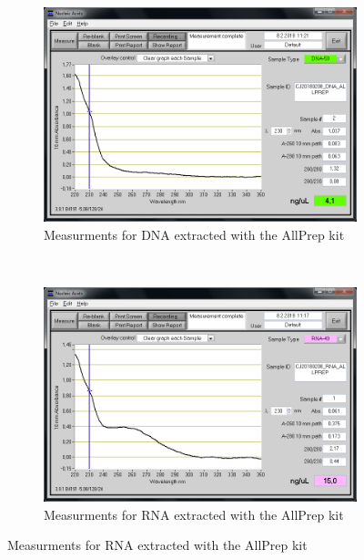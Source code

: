 \begin{figure}[H] %
    \centering
    \caption{Screen captures of the measurements by NanoDrop spectrophotometer}
    \label{fig:CJ20180208_ALLPREP}
    \begin{subfigure}[b]{0.49\textwidth}
        \includegraphics[width=\textwidth]{graphics/screenshots/CJ20180208_DNA_ALLPREP.png}
        \caption{Measurments for DNA extracted with the AllPrep kit}
        \label{sfig:CJ20180208_DNA_ALLPREP}
    \end{subfigure}
    ~ 
    \begin{subfigure}[b]{0.49\textwidth}
        \includegraphics[width=\textwidth]{graphics/screenshots/CJ20180208_RNA_ALLPREP.png}
        \caption{Measurments for RNA extracted with the AllPrep kit}
        \label{sfig:CJ20180208_RNA_ALLPREP}
    \end{subfigure}
\end{figure}

